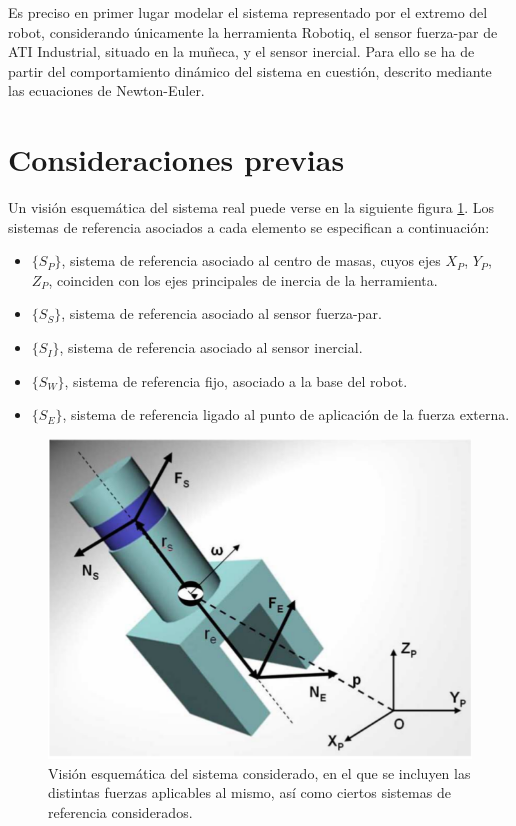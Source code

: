 Es preciso en primer lugar modelar el sistema representado por el extremo del robot, considerando únicamente la herramienta Robotiq, el sensor fuerza-par de ATI Industrial, situado en la muñeca, y el sensor inercial. Para ello se ha de partir del comportamiento dinámico del sistema en cuestión, descrito mediante las ecuaciones de Newton-Euler. \par

\section{Consideraciones previas}

Un visión esquemática del sistema real puede verse en la siguiente figura \ref{fig:esquemasistema}. Los sistemas de referencia asociados a cada elemento se especifican a continuación:

\begin{itemize}
  \item $\{S_P\}$, sistema de referencia asociado al centro de masas, cuyos ejes $X_P$, $Y_P$, $Z_P$, coinciden con los ejes principales de inercia de la herramienta.
  \item $\{S_S\}$, sistema de referencia asociado al sensor fuerza-par.
  \item $\{S_I\}$, sistema de referencia asociado al sensor inercial.
  \item $\{S_W\}$, sistema de referencia fijo, asociado a la base del robot.
  \item $\{S_E\}$, sistema de referencia ligado al punto de aplicación de la fuerza externa.
\end{itemize}

\begin{figure}[h!]
\centering
\includegraphics[scale=0.6]{Figuras/EsquemaSistema}
\caption[Visión esquemática del sistema considerado, con fuerzas y sistemas de referencia]{Visión esquemática del sistema considerado, en el que se incluyen las distintas fuerzas aplicables al mismo, así como ciertos sistemas de referencia considerados.}
\label{fig:esquemasistema}
\end{figure}

